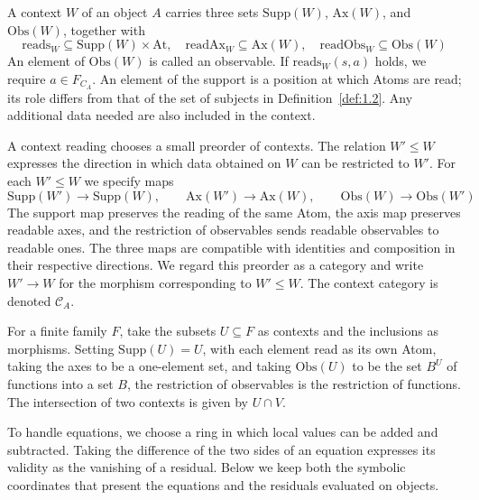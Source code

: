 \begin{definition}\label{def:1.10}

A context $W$ of an object $A$ carries three sets
$\mathrm{Supp}(W)$, $\mathrm{Ax}(W)$, and $\mathrm{Obs}(W)$, together with
\[
\mathrm{reads}_W\subseteq\mathrm{Supp}(W)\times\mathrm{At},
\quad
\mathrm{readAx}_W\subseteq\mathrm{Ax}(W),
\quad
\mathrm{readObs}_W\subseteq\mathrm{Obs}(W)
\]
An element of $\mathrm{Obs}(W)$ is called an observable.
If $\mathrm{reads}_W(s,a)$ holds, we require $a\in F_{C_A}$.
An element of the support is a position at which Atoms are read; its role differs
from that of the set of subjects in Definition~\ref{def:1.2}.
Any additional data needed are also included in the context.

A context reading chooses a small preorder of contexts.
The relation $W'\leq W$ expresses the direction in which data obtained on $W$ can
be restricted to $W'$.
For each $W'\leq W$ we specify maps
\[
\mathrm{Supp}(W')\longrightarrow\mathrm{Supp}(W),\qquad
\mathrm{Ax}(W')\longrightarrow\mathrm{Ax}(W),\qquad
\mathrm{Obs}(W)\longrightarrow\mathrm{Obs}(W')
\]
The support map preserves the reading of the same Atom, the axis map preserves
readable axes, and the restriction of observables sends readable observables to
readable ones.
The three maps are compatible with identities and composition in their respective directions.
We regard this preorder as a category and write $W'\to W$ for the morphism
corresponding to $W'\leq W$.
The context category is denoted $\mathcal{C}_A$.

\end{definition}

\begin{example}\label{ex:1.11}

For a finite family $F$, take the subsets $U\subseteq F$ as contexts and the
inclusions as morphisms. Setting $\mathrm{Supp}(U)=U$, with each element read as
its own Atom, taking the axes to be a one-element set, and taking
$\mathrm{Obs}(U)$ to be the set $B^U$ of functions into a set $B$, the
restriction of observables is the restriction of functions.
The intersection of two contexts is given by $U\cap V$.

To handle equations, we choose a ring in which local values can be added and
subtracted. Taking the difference of the two sides of an equation expresses its
validity as the vanishing of a residual. Below we keep both the symbolic
coordinates that present the equations and the residuals evaluated on objects.

\end{example}

